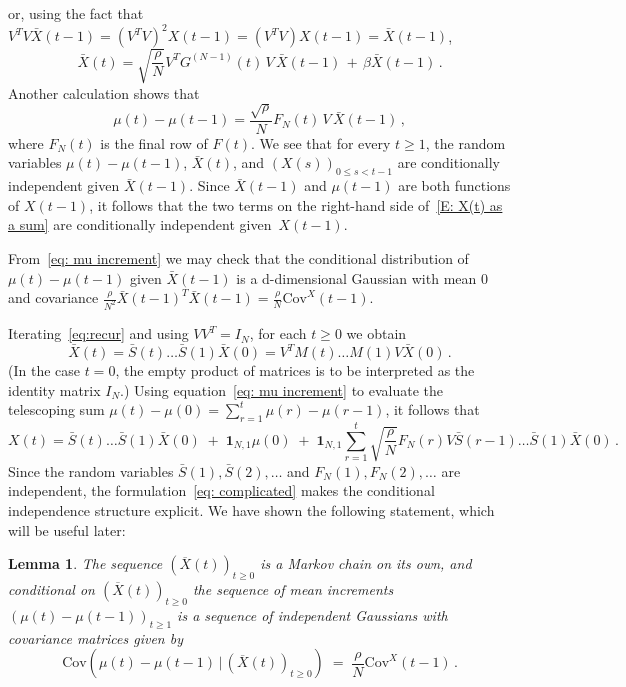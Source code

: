 \documentclass[12pt]{article}
\newtheorem{lemma}{Lemma}
\newcommand{\Cov}{\mathrm{Cov}}
\newcommand{\1}{\mathbf{1}}
\begin{document}
or, using the fact that $V^T V \bar X(t-1) = (V^T V)^2 X(t-1) =  (V^T V) X(t-1) = \bar X(t-1)$,  
\begin{equation}\label{E: X tilde} 
\bar{X}(t) = 
\sqrt{\frac{\rho}N}
V^T G^{(N-1)}\!(t)\,V\,\bar{X}(t-1) \,+\, \beta \bar{X}(t-1)\,.\end{equation}
Another calculation shows that
\begin{equation}\label{eq: mu increment}
\mu(t) - \mu(t-1) = \frac{\sqrt{\rho}}{N} F_N(t)\, V \,\bar{X}(t-1) \,,
\end{equation}
where $F_N(t)$ is the final row of $F(t)$. We see that for every $t \ge 1$, the random variables $\mu(t) - \mu(t-1)$, $\bar X(t)$, and $\left(X(s)\right)_{0 \le s < t-1}$ are conditionally independent given $\bar X(t-1)$. Since $\bar{X}(t-1)$ and $\mu(t-1)$ are both functions of $X(t-1)$, it follows that the two terms on the right-hand side of~\eqref{E: X(t) as a sum} are conditionally independent given~$X(t-1)$.

From~\eqref{eq: mu increment} we may check that the conditional distribution of $\mu(t) - \mu(t-1)$ given $\bar{X}(t-1)$ is a d-dimensional Gaussian with mean $0$ and covariance $\frac{\rho}{N^2} \bar X(t-1)^T \bar X(t-1) = \frac{\rho}{N} \Cov^X(t-1)$.


Iterating~\eqref{eq:recur} and using $VV^T = I_N$, for each $t \ge 0$ we obtain
\begin{equation}\label{eq: Xbar in terms of Lbar product} 
\bar{X}(t)  =  \bar{S}(t) \dots \bar{S}(1) \bar{X}(0) = V^T M(t) \dots M(1) V \bar{X}(0)\,.
\end{equation}
(In the case $t=0$, the empty product of matrices is to be interpreted as the identity matrix $I_N$.)
Using equation~\eqref{eq: mu increment} to evaluate the telescoping sum $\mu(t) - \mu(0) = \sum_{r = 1}^t \mu(r) - \mu(r-1)$, it follows that
\begin{equation}\label{eq: complicated} 
X(t) = \bar{S}(t) \dots \bar{S}(1)\bar{X}(0) \;+\; \mathbf{1}_{N,1}\mu(0) \;+\; \mathbf{1}_{N,1}\sum_{r=1}^t \sqrt{\frac{\rho}{N}} F_N(r) V \bar{S}(r-1) \dots \bar{S}(1)\bar{X}(0)\,.
\end{equation}
Since the random variables $\bar{S}(1), \bar{S}(2), \dots $ and $F_N(1), F_N(2), \dots$ are independent, the formulation~\eqref{eq: complicated} makes the conditional independence structure explicit. We have shown the following statement, which will be useful later:


\begin{lemma}\label{lem: conditional independence}
The sequence $\left(\overline{X}(t)\right)_{t \ge 0}$ is a Markov chain on its own, and conditional on $\left(\overline{X}(t)\right)_{t \ge 0}$ the sequence of mean increments $\left(\mu(t) - \mu(t-1)\right)_{t \ge 1}$ is a sequence of independent Gaussians with covariance matrices given by
$$ 
\Cov\left(\mu(t) - \mu(t-1) \,|\, \left( \overline{X}(t)\right)_{t \ge 0}\right)\;=\; \frac{\rho}{N} \Cov^X(t-1)\,.
$$
\end{lemma}
\end{document}
